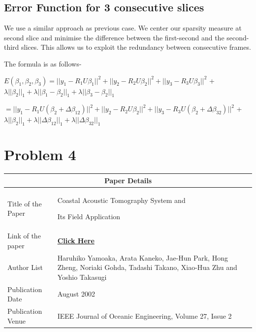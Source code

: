 \documentclass[a4paper,11pt]{article}
\numberwithin{definition}{section}
\numberwithin{mytheorem}{subsection}
\begin{document}
\subsection{Error Function for 3 consecutive slices}

We use a similar approach as previous case. We center our sparsity measure at second slice and minimise the difference between the first-second and the second-third slices. This allows us to exploit the redundancy between consecutive frames.

The formula is as follows-

$E(\beta_1,\beta_2,\beta_3) =  ||y_1 - R_1U\beta_1||^2 + ||y_2 - R_2U\beta_2||^2 + ||y_3 - R_3U\beta_3||^2$ + $\lambda||\beta_2||_1 + \lambda||\beta_1-\beta_2||_1  + \lambda||\beta_3-\beta_2||_1$

$=  ||y_1 - R_1U(\beta_2 + \Delta\beta_{12})||^2 + ||y_2 - R_2U\beta_2||^2 + ||y_3 - R_3U(\beta_2 + \Delta\beta_{32})||^2$ + $\lambda||\beta_2||_1 + \lambda||\Delta\beta_{12}||_1  + \lambda||\Delta\beta_{32}||_1$






\section{Problem 4}

\begin{center}
    \begin{tabular}{ |p{3.5cm}||p{10cm}|}
   
    \hline
    \multicolumn{2}{|c|}{Paper Details} \\
    \hline
    Title of the Paper& Coastal Acoustic Tomography System and 
    
    Its Field Application\\
    \hline
    Link of the paper  &  \href{https://ieeexplore.ieee.org/document/1002483}{\textbf{Click Here}}  \\
    \hline
    Author List & Haruhiko Yamoaka, Arata Kaneko, Jae-Hun Park, Hong Zheng, Noriaki Gohda, Tadashi Takano, Xiao-Hua Zhu and Yoshio Takasugi \\
    \hline
    Publication Date  & August 2002 \\
    \hline
    Publication Venue  &  IEEE Journal of Oceanic Engineering, Volume 27, Issue 2 \\
    \hline
   \end{tabular}
\end{center}
\end{document}
